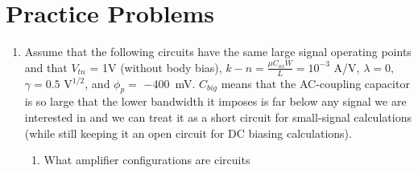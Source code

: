 \section{Practice Problems}

\begin{enumerate}
    \item Assume that the following circuits have the same large signal operating points and that $V_{tn}$ = 1V (without body bias), $k-n = \frac{\mu C_{ox} W}{L} = 10^{-3}$ A/V\sq, $\lambda = 0$, $\gamma = 0.5$ V$^{1/2}$, and $\phi_p = $ \SI{-400}{\milli \V}. $C_{big}$ means that the AC-coupling capacitor is so large that the lower bandwidth it imposes is far below any signal we are interested in and we can treat it as a short circuit for small-signal calculations (while still keeping it an open circuit for DC biasing calculations).
    
    \begin{enumerate}
        \item What amplifier configurations are circuits
    \end{enumerate}
\end{enumerate}